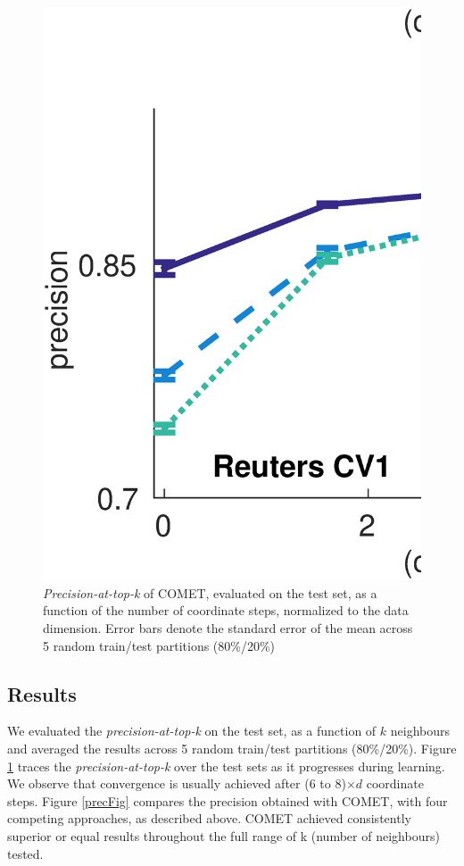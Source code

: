 \documentclass{article}
\begin{document}
\begin{figure}[!ht]
\vskip 0.2in
\begin{center}
\centerline{\includegraphics[width=\columnwidth]{COMET_convergence}}
\caption{ \textit{Precision-at-top-k} of COMET, evaluated on the test set, as a function of the number of coordinate steps, normalized to the data dimension. Error bars denote the standard error of the mean across 5 random train/test partitions (80\%/20\%) }
\label{cometConvergeFig}
\end{center}
\vskip -0.2in
\end{figure} 

\subsection{Results}
 We evaluated the \textit{precision-at-top-k} on the test set, as a function of $k$ neighbours and averaged the results across 5 random train/test partitions (80\%/20\%).
Figure \ref{cometConvergeFig} traces the \textit{precision-at-top-k} over the test sets as it progresses during learning. We observe that convergence is usually achieved after (6 to 8)$\times d$ coordinate steps.
Figure \ref{precFig} compares the precision obtained with COMET, with four competing approaches, as described above. COMET achieved consistently superior or equal results throughout the full range of k (number of neighbours) tested. 
\end{document}
